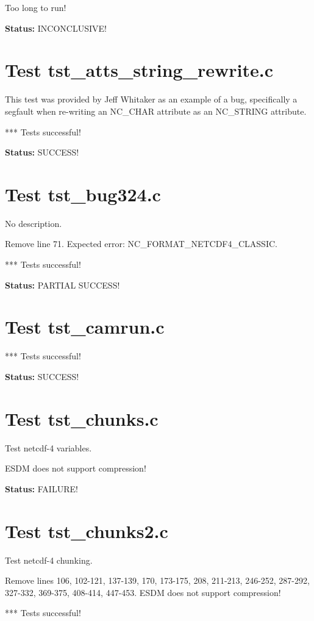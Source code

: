Too long to run!

{\bf \large Status: } INCONCLUSIVE!

\section{Test tst\_atts\_string\_rewrite.c}

This test was provided by Jeff Whitaker as an example of a bug,
specifically a segfault when re-writing an NC\_CHAR attribute as
an NC\_STRING attribute.

*** Tests successful!

{\bf \large Status: } SUCCESS!

\section{Test tst\_bug324.c}

No description.

Remove line 71. Expected error: NC\_FORMAT\_NETCDF4\_CLASSIC.

*** Tests successful!

{\bf \large Status: } PARTIAL SUCCESS!

\section{Test tst\_camrun.c}

*** Tests successful!

{\bf \large Status: } SUCCESS!

\section{Test tst\_chunks.c}

Test netcdf-4 variables.

ESDM does not support compression!

{\bf \large Status: } FAILURE!

\section{Test tst\_chunks2.c}

Test netcdf-4 chunking.

Remove lines 106, 102-121, 137-139, 170, 173-175, 208, 211-213, 246-252, 287-292, 327-332, 369-375, 408-414, 447-453. ESDM does not support compression!

*** Tests successful!

